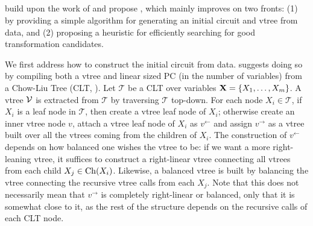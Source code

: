 \subsection{}\label{sec:strudel}

\citet{dang20} build upon the work of  and propose , which
mainly improves  on two fronts: (1) by providing a simple algorithm for
generating an initial circuit and vtree from data, and (2) proposing a heuristic for efficiently
searching for good transformation candidates.

We first address how to construct the initial circuit from data. \citeauthor{dang20} suggests doing
so by compiling both a vtree and linear sized PC (in the number of variables) from a Chow-Liu Tree
(CLT, \cite{chow68}). Let $\mathcal{T}$ be a CLT over variables $\mathbf{X}=\{X_1,\ldots,X_m\}$. A vtree
$\operatorname{\mathcal{V}}$ is extracted from $\mathcal{T}$ by traversing $\mathcal{T}$ top-down. For each node
$X_i\in\mathcal{T}$, if $X_i$ is a leaf node in $\mathcal{T}$, then create a vtree leaf node of
$X_i$; otherwise create an inner vtree node $v$, attach a vtree leaf node of $X_i$ as $v^\gets$ and
assign $v^\to$ as a vtree built over all the vtrees coming from the children of $X_i$. The
construction of $v^\gets$ depends on how balanced one wishes the vtree to be: if we want a more
right-leaning vtree, it suffices to construct a right-linear vtree connecting all vtrees from each
child $X_j\in\operatorname*{\normalfont{Ch}}(X_i)$. Likewise, a balanced vtree is built by balancing the vtree connecting the
recursive vtree calls from each $X_j$. Note that this does not necessarily mean that $v^\to$ is
completely right-linear or balanced, only that it is somewhat close to it, as the rest of the
structure depends on the recursive calls of each CLT node.

